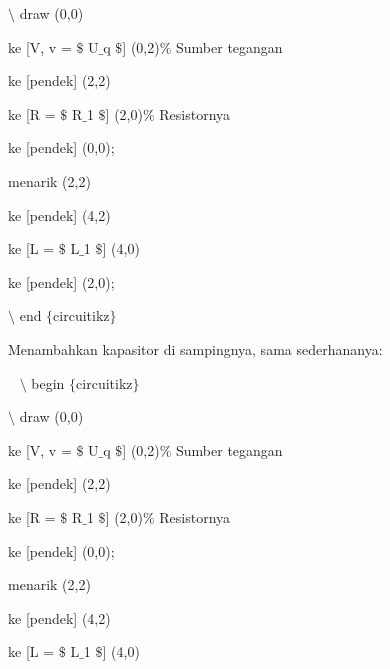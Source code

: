 \noindent 
 $\setminus$ draw (0,0)
\par


\noindent 
 ke [V, v = $\$$ U$ \_ $q $\$$] (0,2)$\%$ Sumber tegangan
\par


\noindent 
 ke [pendek] (2,2)
\par


\noindent 
 ke [R = $\$$ R$ \_ $1 $\$$] (2,0)$\%$ Resistornya
\par


\noindent 
 ke [pendek] (0,0);
\par


\noindent 
 menarik (2,2)
\par


\noindent 
 ke [pendek] (4,2)
\par


\noindent 
 ke [L = $\$$ L$ \_ $1 $\$$] (4,0)
\par


\noindent 
 ke [pendek] (2,0);
\par


\noindent 
 $\setminus$ end $ \{ $circuitikz$ \} $ 
\par


\noindent 
Menambahkan kapasitor di sampingnya, sama sederhananya:
\par


\noindent 
~ $\setminus$ begin $ \{ $circuitikz$ \} $
\par


\noindent 
 $\setminus$ draw (0,0)
\par


\noindent 
 ke [V, v = $\$$ U$ \_ $q $\$$] (0,2)$\%$ Sumber tegangan
\par


\noindent 
 ke [pendek] (2,2)
\par


\noindent 
 ke [R = $\$$ R$ \_ $1 $\$$] (2,0)$\%$ Resistornya
\par


\noindent 
 ke [pendek] (0,0);
\par


\noindent 
 menarik (2,2)
\par


\noindent 
 ke [pendek] (4,2)
\par


\noindent 
 ke [L = $\$$ L$ \_ $1 $\$$] (4,0)
\par


